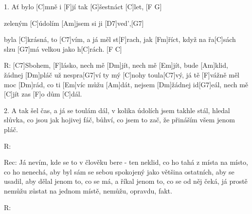 
1. Ať bylo [C]mně i [F]jí tak [G]\null šestnáct [C]let, [F G] 

zeleným [C]\null údolím [Am]jsem si ji [D7]ved',[G7] 

byla [C]krásná, to [C7]vím, a já měl st[F]rach, jak [Fm]\null říct,
když na řa[C]sách slzu [G7]má velkou jako h[C]rách. [F C]

R: [C7]Sbohem, [F]lásko, nech mě [Dm]jít, nech mě [Em]jít, bude [Am]klid,
žádnej [Dm]pláč už nespra[G7]ví ty mý [C]nohy toula[C7]vý,
já tě [F]vážně měl moc [Dm]rád, co ti [Em]víc můžu [Am]dát,
nejsem [Dm]\null žádnej id[G7]eál, nech mě [C]jít zas [F]o dům [C]dál.

2. A tak šel čas, a já se toulám dál,
v kolika údolích jsem takhle stál,
hledal slůvka, co jsou jak hojivej fáč,
bůhví, co jsem to zač, že přináším všem jenom pláč.

R:

Rec: Já nevím, kde se to v člověku bere - ten neklid, co ho tahá z místa na místo, co ho nenechá, aby byl sám se sebou spokojený jako většina ostatních, aby se usadil, aby dělal jenom to, co se má, a říkal jenom to, co se od něj čeká, já prostě nemůžu zůstat na jednom místě, nemůžu, opravdu, fakt.

R:

